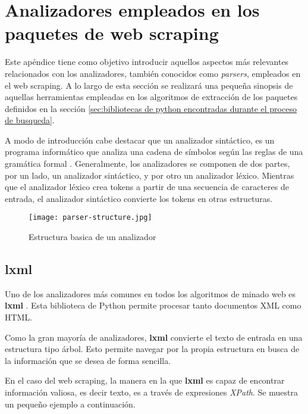 \chapter{Analizadores empleados en los paquetes de web scraping}
\label{cha:analizadores empleados en los paquetes de web scraping}

Este apéndice tiene como objetivo introducir aquellos aspectos más relevantes relacionados con los
analizadores, también conocidos como \emph{parsers}, empleados en el web scraping. A lo largo de esta 
sección se realizará una pequeña sinopsis de aquellas herramientas empleadas en los algoritmos de extracción 
de los paquetes definidos en la sección \ref{sec:bibliotecas de python encontradas durante el proceso de 
busqueda}.

A modo de introducción cabe destacar que un analizador sintáctico, es un programa informático que analiza
una cadena de símbolos según las reglas de una gramática formal \cite{parser-lexer}. Generalmente, los 
analizadores se componen de dos partes, por un lado, un analizador sintáctico, y por otro un analizador 
léxico. Mientras que el analizador léxico crea tokens a partir de una secuencia de caracteres de entrada, 
el analizador sintáctico convierte los tokens en otras estructuras.

\begin{figure}[tphb]
    \centering
    \texttt{[image: parser-structure.jpg]}
    \caption{Estructura basica de un analizador}
    \label{img:estructura basica de un analizador}
\end{figure}

\section{lxml}
\label{sec:lxml}

Uno de los analizadores más comunes en todos los algoritmos de minado web es \textbf{lxml} \cite{lxml}. 
Esta biblioteca de Python permite procesar tanto documentos XML como HTML.

Como la gran mayoría de analizadores, \textbf{lxml} convierte el texto de entrada en una estructura tipo 
árbol. Esto permite navegar por la propia estructura en busca de la información que se desea de forma 
sencilla. 

En el caso del web scraping, la manera en la que \textbf{lxml} es capaz de encontrar información valiosa, 
es decir texto, es a través de expresiones \emph{XPath}. Se muestra un pequeño ejemplo a continuación.

